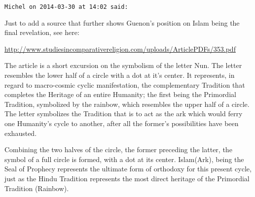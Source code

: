 \begin{footnotesize}
\begin{sffamily}
\hfill

\texttt{Michel on 2014-03-30 at 14:02 said: }

Just to add a source that further shows Guenon's position on Islam being the final revelation, see here:

\url{http://www.studiesincomparativereligion.com/uploads/ArticlePDFs/353.pdf}

The article is a short excursion on the symbolism of the letter Nun. The letter resembles the lower half of a circle with a dot at it's center. It represents, in regard to macro-cosmic cyclic manifestation, the complementary Tradition that completes the Heritage of an entire Humanity; the first being the Primordial Tradition, symbolized by the rainbow, which resembles the upper half of a circle. The letter symbolizes the Tradition that is to act as the ark which would ferry one Humanity's cycle to another, after all the former's possibilities have been exhausted.

Combining the two halves of the circle, the former preceding the latter, the symbol of a full circle is formed, with a dot at its center. Islam(Ark), being the Seal of Prophecy represents the ultimate form of orthodoxy for this present cycle, just as the Hindu Tradition represents the most direct heritage of the Primordial Tradition (Rainbow).


\hfill


\end{sffamily}\end{footnotesize}
